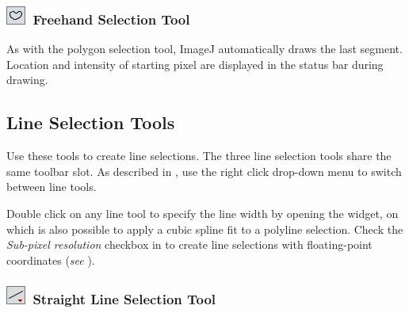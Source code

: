 

\subsubsection[Freehand Selection Tool]{\noindent \textsf{\protect\includegraphics[bb=0bp 5bp 20bp 20bp,scale=0.6]{images/tools/Freehand}}~Freehand
Selection Tool\label{sub:Freehand-Selection-Tool}}

As with the polygon selection tool, ImageJ automatically draws the
last segment. Location and intensity of starting pixel are displayed
in the status bar during drawing.




\subsection{Line Selection Tools\label{sec:Line-Selection-Tools}}

Use these tools to create line selections. The three line selection
tools share the same toolbar slot. As described in ,
use the right click drop-down menu to switch between line tools. 

Double click on any line tool to specify the line width by opening
the \textsf{}
widget, on which is also possible to apply a cubic spline fit to a
polyline selection. Check the \emph{Sub-pixel resolution} checkbox
in 
to create line selections with floating-point coordinates (\emph{see}
).


\subsubsection[Straight Line Selection Tool]{\protect\includegraphics[bb=0bp 5bp 20bp 20bp,scale=0.6]{images/tools/StraightLine}~Straight
Line Selection Tool\label{sub:Straight-Line-Selection}}

